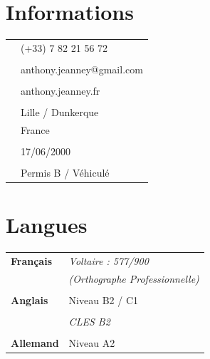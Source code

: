 \documentclass[a4paper, 12pt]{article}
\begin{document}
\begin{minipage}[t]{0.35\textwidth}

	\section*{\textcolor{sectioncolor}{Informations}}
	\begin{tabular}{ m{} m{} }
		\textbf{\faPhone}        & (+33) 7 82 21 56 72       \\
		                         &                           \\
		\textbf{\faEnvelope}     & anthony.jeanney@gmail.com \\
		                         &                           \\
		\textbf{\faGlobe}        & anthony.jeanney.fr        \\
		                         &                           \\
		\textbf{\faMapMarker}    & Lille / Dunkerque         \\
		                         & France                    \\
		                         &                           \\
		\textbf{\faBirthdayCake} & 17/06/2000                \\
		                         &                           \\
		\textbf{\faCar}          & Permis B / Véhiculé       \\
	\end{tabular}

	\section*{\textcolor{sectioncolor}{Langues}}
	\begin{tabular}{ m{} m{} }
		\textbf{Français} & \textit{Voltaire : 577/900}            \\
		                  & \textit{(Orthographe Professionnelle)} \\
		                  &                                        \\
		\textbf{Anglais}  & Niveau B2 / C1                         \\
		                  &                                        \\
		                  & \textit{CLES B2}                       \\
		                  &                                        \\
		\textbf{Allemand} & Niveau A2
	\end{tabular}


\end{minipage}
\end{document}
